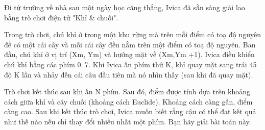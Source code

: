 Đi từ trường về nhà sau một ngày học căng thẳng, Ivica đã sẵn sàng giải lao bằng trò chơi điện tử "Khỉ \& chuối".  

   Trong trò chơi, chú khỉ ở trong một khu rừng mà trên mỗi điểm có toạ độ nguyên đề có một cái cây và mỗi cái cây đều nằm trên một điểm có toạ độ nguyên. Ban đầu, chú khỉ ở vị trí (Xm, Ym)  và hướng mặt về (Xm,Ym +1). Ivica điều khiển chú khỉ bằng các phím 0..7. Khi Ivica ấn phím thứ K, khỉ  quay mặt sang trái 45 độ K lần và nhảy đến cái câu đầu tiên mà nó nhìn thấy (sau khi đã quay mặt).  

   Trò chơi kết thúc sau khi ấn N phím. Sau đó, điểm được tính dựa trên khoảng cách giữa khỉ và cây chuối (khoảng cách Euclide). Khoảng cách càng gần, điểm càng cao. Sau khi kết thúc trò chơi, Ivica muốn biết rằng cậu có thể đạt kết quả như thế nào nếu chỉ thay đổi nhiều nhất một phím. Bạn hãy giải bài toán này.